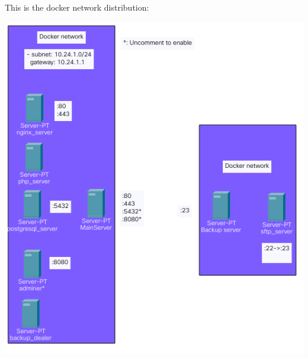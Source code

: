 \documentclass[11pt]{article}
\begin{document}
    This is the docker network distribution:
    \begin{center}
    \includegraphics[scale=1]{NetworkDistribution}
    \end{center}
\end{document}
